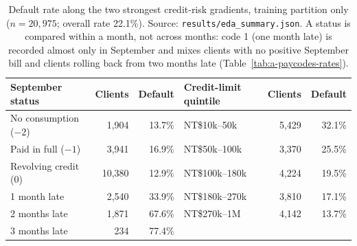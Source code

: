 \begin{table}[!htbp]
  \caption{Default rate along the two strongest credit-risk gradients, training partition only ($n = 20{,}975$; overall rate 22.1\%). Source: \texttt{results/eda\_summary.json}. A status is compared within a month, not across months: code 1 (one month late) is recorded almost only in September and mixes clients with no positive September bill and clients rolling back from two months late (Table~\ref{tab:a-paycodes-rates}).}
  \label{tab:a-gradients}
  \centering
  \small
  \begin{tabular}{@{}lrrlrr@{}}
    \toprule
    September status & Clients & Default & Credit-limit quintile & Clients & Default \\
    \midrule
    No consumption ($-2$) & 1,904 & 13.7\% & NT\$10k--50k & 5,429 & 32.1\% \\
    Paid in full ($-1$) & 3,941 & 16.9\% & NT\$50k--100k & 3,370 & 25.5\% \\
    Revolving credit (0) & 10,380 & 12.9\% & NT\$100k--180k & 4,224 & 19.5\% \\
    1 month late & 2,540 & 33.9\% & NT\$180k--270k & 3,810 & 17.1\% \\
    2 months late & 1,871 & 67.6\% & NT\$270k--1M & 4,142 & 13.7\% \\
    3 months late & 234 & 77.4\% &  &  &  \\
    \bottomrule
  \end{tabular}
\end{table}

